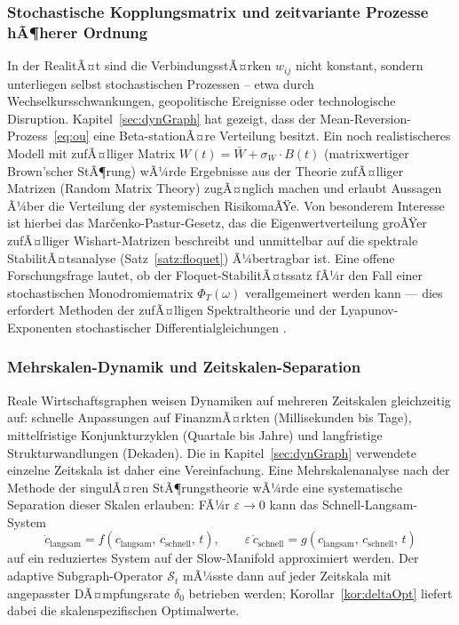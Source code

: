 ﻿\documentclass[a4paper,12pt]{article}
\theoremstyle{definition}
\begin{document}
\subsubsection{Stochastische Kopplungsmatrix und zeitvariante Prozesse hÃ¶herer Ordnung}

In der RealitÃ¤t sind die VerbindungsstÃ¤rken $w_{ij}$ nicht konstant, sondern unterliegen selbst
stochastischen Prozessen -- etwa durch Wechselkursschwankungen, geopolitische Ereignisse oder
technologische Disruption. Kapitel~\ref{sec:dynGraph} hat gezeigt, dass der
Mean-Reversion-Prozess~\eqref{eq:ou} eine Beta-stationÃ¤re Verteilung besitzt. Ein noch
realistischeres Modell mit zufÃ¤lliger Matrix $W(t) = \bar{W} + \sigma_W \cdot B(t)$
(matrixwertiger Brown'scher StÃ¶rung) wÃ¼rde Ergebnisse aus der Theorie zufÃ¤lliger Matrizen
(Random Matrix Theory) \citep{mehta2004random} zugÃ¤nglich machen und erlaubt Aussagen Ã¼ber
die Verteilung der systemischen RisikomaÃŸe. Von besonderem Interesse ist hierbei das
Mar\v{c}enko-Pastur-Gesetz, das die Eigenwertverteilung groÃŸer zufÃ¤lliger Wishart-Matrizen
beschreibt und unmittelbar auf die spektrale StabilitÃ¤tsanalyse (Satz~\ref{satz:floquet})
Ã¼bertragbar ist. Eine offene Forschungsfrage lautet, ob der Floquet-StabilitÃ¤tssatz
fÃ¼r den Fall einer stochastischen Monodromiematrix $\Phi_T(\omega)$ verallgemeinert werden
kann --- dies erfordert Methoden der zufÃ¤lligen Spektraltheorie und der Lyapunov-Exponenten
stochastischer Differentialgleichungen \citep{arnold1998random}.

\subsubsection{Mehrskalen-Dynamik und Zeitskalen-Separation}

Reale Wirtschaftsgraphen weisen Dynamiken auf mehreren Zeitskalen gleichzeitig auf:
schnelle Anpassungen auf Finanz\-mÃ¤rkten (Millisekunden bis Tage), mittelfristige
Konjunkturzyklen (Quartale bis Jahre) und langfristige Strukturwandlungen (Dekaden).
Die in Kapitel~\ref{sec:dynGraph} verwendete einzelne Zeitskala ist daher eine
Vereinfachung. Eine Mehr\-skalen\-analyse nach der Methode der singulÃ¤ren
StÃ¶rungstheorie \citep{kokotovic1999singular} wÃ¼rde eine systematische Separation
dieser Skalen erlauben: FÃ¼r $\varepsilon \to 0$ kann das Schnell-Langsam-System
\[
    \dot{c}_{\text{langsam}} = f(c_{\text{langsam}},\, c_{\text{schnell}},\, t),
    \qquad
    \varepsilon\,\dot{c}_{\text{schnell}} = g(c_{\text{langsam}},\, c_{\text{schnell}},\, t)
\]
auf ein reduziertes System auf der Slow-Manifold approximiert werden. Der adaptive
Subgraph-Operator $\mathcal{S}_t$ mÃ¼sste dann auf jeder Zeitskala mit angepasster
DÃ¤mpfungsrate $\delta_0$ betrieben werden; Korollar~\ref{kor:deltaOpt} liefert
dabei die skalenspezifischen Optimalwerte.
\end{document}

